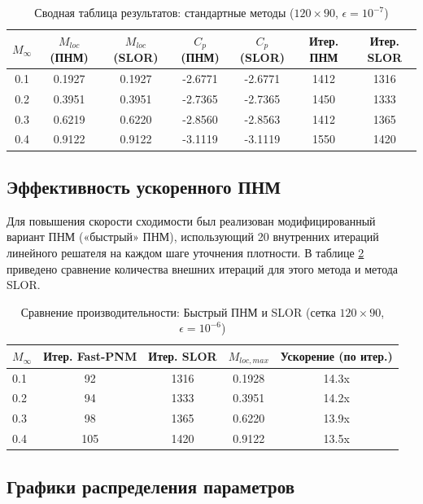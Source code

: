 \documentclass[a4paper,12pt]{article}
\begin{document}
	\begin{table}[H]
		\centering
		\caption{Сводная таблица результатов: стандартные методы ($120 \times 90$, $\epsilon=10^{-7}$)}
		\label{tab:summary}
		\begin{tabular}{ccccccc}
			\toprule
			$M_\infty$ & $M_{loc}$ (ПНМ) & $M_{loc}$ (SLOR) & $C_p$ (ПНМ) & $C_p$ (SLOR) & Итер. ПНМ & Итер. SLOR \\
			\midrule
			0.1 & 0.1927 & 0.1927 & -2.6771 & -2.6771 & 1412 & 1316 \\
			0.2 & 0.3951 & 0.3951 & -2.7365 & -2.7365 & 1450 & 1333 \\
			0.3 & 0.6219 & 0.6220 & -2.8560 & -2.8563 & 1412 & 1365 \\
			0.4 & 0.9122 & 0.9122 & -3.1119 & -3.1119 & 1550 & 1420 \\
			\bottomrule
		\end{tabular}
	\end{table}

	\subsection{Эффективность ускоренного ПНМ}

	Для повышения скорости сходимости был реализован модифицированный вариант ПНМ («быстрый» ПНМ), использующий 20 внутренних итераций линейного решателя на каждом шаге уточнения плотности. В таблице \ref{tab:fast_comp} приведено сравнение количества внешних итераций для этого метода и метода SLOR.

	\begin{table}[H]
		\centering
		\caption{Сравнение производительности: Быстрый ПНМ и SLOR (сетка $120 \times 90$, $\epsilon=10^{-6}$)}
		\label{tab:fast_comp}
		\begin{tabular}{lcccc}
			\toprule
			$M_\infty$ & Итер. Fast-PNM & Итер. SLOR & $M_{loc, max}$ & Ускорение (по итер.) \\
			\midrule
			0.1 & 92 & 1316 & 0.1928 & 14.3x \\
			0.2 & 94 & 1333 & 0.3951 & 14.2x \\
			0.3 & 98 & 1365 & 0.6220 & 13.9x \\
			0.4 & 105 & 1420 & 0.9122 & 13.5x \\
			\bottomrule
		\end{tabular}
	\end{table}

	\subsection{Графики распределения параметров}
\end{document}
